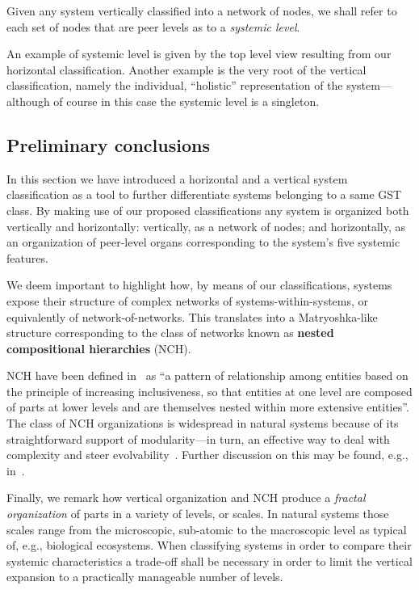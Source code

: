 \documentclass[twocolumn]{svjour3}
\begin{document}
\begin{definition}
Given any system vertically classified into a network of nodes, we shall refer to each set of nodes
that are peer levels as to a \emph{systemic level}.
\end{definition}
An example of systemic level is given by the top level view resulting from our
horizontal classification. Another example is
	the very root of the vertical classification, namely the individual, ``holistic''
representation of the system---although of course in this case the systemic level is a singleton.

\subsection{Preliminary conclusions}
In this section we have introduced a horizontal and a vertical system classification as a tool to further
differentiate systems belonging to a same GST class.
By making use of our proposed classifications any system 
is organized both vertically and horizontally: vertically, as a network of nodes; and horizontally,
as an organization of peer-level organs corresponding to the system's five systemic features.

We deem important to highlight how, by means of our classifications,
systems expose their structure of complex networks of systems-within-systems,
or equivalently of network-of-networks. This translates into 
a Matryoshka-like structure corresponding to the class of networks
known as \textbf{nested compositional hierarchies} (NCH).

NCH have been defined in~\cite{HT:TE14a} as ``a pattern of relationship among entities based on the
principle of increasing inclusiveness, so that entities at one level are composed of parts
at lower levels and are themselves nested within more extensive entities''.
The class of NCH organizations
is widespread in natural systems because of its straightforward support of modularity---in
turn, an effective way to deal with complexity and steer evolvability~\cite{WaAl1996}.
Further discussion on this may be found, e.g., in~\cite{DF15c}.

Finally, we remark how vertical organization and NCH produce a
\emph{fractal organization\/} of parts in a variety of levels, or scales. In
natural systems those scales range from the microscopic, sub-atomic 
to the macroscopic level as typical of, e.g., biological ecosystems.
When classifying systems in order to compare their systemic characteristics a trade-off
shall be necessary
in order to limit the vertical expansion to a practically manageable number of levels.
\end{document}
